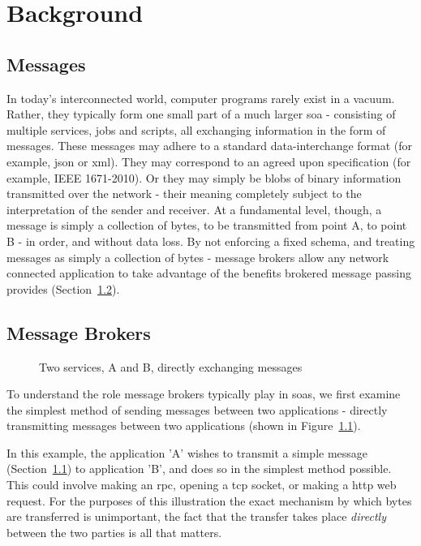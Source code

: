 \chapter{Background}
\label{chap:Background}

\section{Messages}
\label{sec:messages}

In today's interconnected world, computer programs rarely exist in a vacuum.
Rather, they typically form one small part of a much larger \gls{soa} -
consisting of multiple services, jobs and scripts, all exchanging information in
the form of messages. These messages may adhere to a standard data-interchange
format (for example, \gls{json} or \gls{xml}). They may correspond to an agreed
upon specification (for example, IEEE 1671-2010\cite{atml}). Or they may simply
be blobs of binary information transmitted over the network - their meaning
completely subject to the interpretation of the sender and receiver. At a
fundamental level, though, a message is simply a collection of bytes, to be
transmitted from point A, to point B - in order, and without data loss. By not
enforcing a fixed schema, and treating messages as simply a collection of bytes -
message brokers allow any network connected application to take advantage of the
benefits brokered message passing provides (Section~\ref{sec:brokers}).

\section{Message Brokers}
\label{sec:brokers}

\begin{figure}[htbp]
  \centering
  
  \caption{Two services, A and B, directly exchanging messages}
  \label{fig:tikz:directMessaging}
\end{figure}

To understand the role message brokers typically play in \glspl{soa}, we first
examine the simplest method of sending messages between two applications -
directly transmitting messages between two applications (shown in
Figure~\ref{fig:tikz:directMessaging}).

In this example, the application 'A' wishes to transmit a simple message
(Section~\ref{sec:messages}) to application 'B', and does so in the simplest
method possible. This could involve making an \gls{rpc}, opening a
\gls{tcp} socket, or making a \gls{http} web request. For the purposes of this
illustration the exact mechanism by which bytes are transferred is unimportant,
the fact that the transfer takes place \emph{directly} between the two parties
is all that matters.


